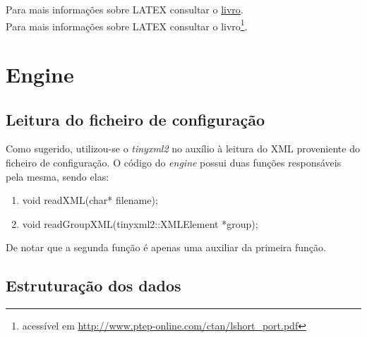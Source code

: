 \documentclass[11pt,a4paper]{report}%
\begin{document}
\newpage

Para mais informações sobre LATEX consultar o
 \href{http://www.ptep-online.com/ctan/lshort_port.pdf}{livro}.\\

 Para mais informações sobre LATEX
 consultar o livro\footnote{acessível em \url{http://www.ptep-online.com/ctan/lshort_port.pdf}}.


\chapter{Engine} \label{chap:engine} %
\section{Leitura do ficheiro de configuração} \label{sec:parsing} %
Como sugerido, utilizou-se o \emph{tinyxml2} no auxílio à leitura do XML proveniente do ficheiro de configuração. O código do \emph{engine} possui duas funções responsáveis pela mesma, sendo elas:
\begin{enumerate}
\item void readXML(char* filename);
\item void readGroupXML(tinyxml2::XMLElement *group);
\end{enumerate}

De notar que a segunda função é apenas uma auxiliar da primeira função.

\section{Estruturação dos dados} \label{sec:structs}
\end{document}
